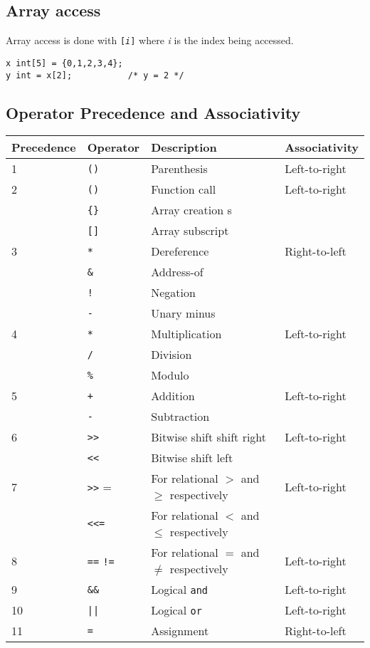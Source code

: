 	\subsection{Array access}
		Array access is done with \texttt{[\textit{i}]} where \textit{i} is the index being accessed. 
		
		\begin{lstlisting}
x int[5] = {0,1,2,3,4};
y int = x[2];  			/* y = 2 */
		\end{lstlisting}
    \subsection{Operator Precedence and Associativity}
        \begin{tabular}{ | l | l | l | l | }\hline
	Precedence  & Operator      & Description & Associativity \\ \hline
	1 & \texttt{()} & Parenthesis        & Left-to-right \\ \hline
    2 & \texttt{()} & Function call      & Left-to-right \\
      & \verb|{}| & Array creation  s   &               \\ 
      & \texttt{[]} & Array subscript    &               \\ \hline
    3 & \texttt{*}  & Dereference        & Right-to-left \\ 
      & \texttt{\&} & Address-of         &               \\
      & \texttt{!}  & Negation           &               \\
      & \texttt{-}  & Unary minus        &               \\ \hline
    4 & \texttt{*}  & Multiplication     & Left-to-right \\ 
      & \texttt{/}  & Division           &               \\
      & \texttt{\%} & Modulo             &               \\ \hline
    5 & \texttt{+}  & Addition           & Left-to-right \\
      & \texttt{-}  & Subtraction        &               \\ \hline
    6 & \verb|>>| & Bitwise shift shift right & Left-to-right \\
      & \verb|<<| & Bitwise shift left & \\ \hline
    7 & \verb|>>| = & For relational $>$ and $\geq$ respectively & Left-to-right \\
      & \verb|<<=| & For relational $<$ and $\leq$ respectively & \\ \hline
    8 & \texttt{==} \texttt{!=} & For relational $=$ and $\neq$ respectively & Left-to-right \\\hline
    9 & \texttt{\&\&} & Logical \texttt{and} & Left-to-right \\ \hline
    10 & \verb!||! &  Logical \texttt{or} & Left-to-right \\ \hline
    11 & \texttt{=} & Assignment & Right-to-left \\ \hline

\end{tabular}


